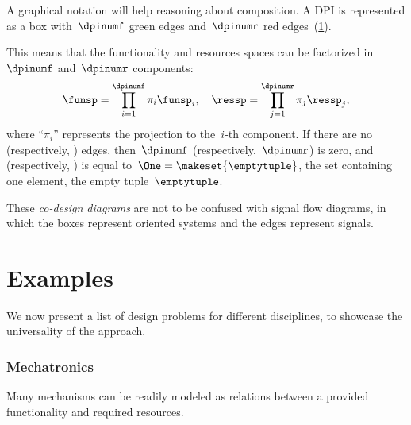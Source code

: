 A graphical notation will help reasoning about composition.
A DPI is represented as a box with~$\dpinumf$ green edges and~$\dpinumr$ red edges~(\cref{fig:dp_graphical}).

\begin{figure}[h]
    \centering
    \caption{\label{fig:dp_graphical}}
\end{figure}


This means that the functionality and resources spaces can be factorized in~$\dpinumf$ and~$\dpinumr$ components:
\begin{equation}
    \funsp=\prod_{i=1}^{\dpinumf}\pi_{i}\funsp_{i},\quad \ressp=\prod_{j=1}^{\dpinumr}\pi_{j}\ressp_{j},
\end{equation}
where ``$\pi_{i}$'' represents the projection to the~$i$-th component.
If there are no  (respectively, ) edges, then~$\dpinumf$ (respectively,~$\dpinumr$) is zero, and \funsp (respectively, \ressp) is equal to~$\One=\makeset{\emptytuple }$, the set containing one element, the empty tuple~$\emptytuple$.

These \emph{co-design diagrams} are not to be confused with signal flow diagrams, in which the boxes represent oriented systems and the edges represent signals.



\section{Examples}
We now present a list of design problems for different disciplines, to showcase the universality of the approach.

\subsubsection{Mechatronics}
Many mechanisms can be readily modeled as relations between a provided functionality and required resources.


